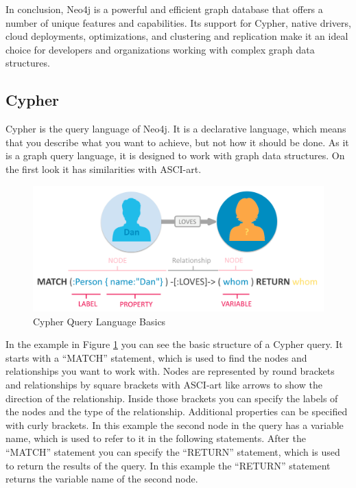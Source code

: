 In conclusion, Neo4j is a powerful and efficient graph database that offers a number of unique features and capabilities. Its support for Cypher, native drivers, cloud deployments, optimizations, and clustering and replication make it an ideal choice for developers and organizations working with complex graph data structures.

\subsection{Cypher} \label{subsec:Cypher}

Cypher is the query language of Neo4j. It is a declarative language, which means that you describe what you want to achieve, but not how it should be done. As it is a graph query language, it is designed to work with graph data structures. On the first look it has similarities with ASCI-art.

\begin{figure}[!h]
    \centering
    \includegraphics[width=1 \linewidth]{images/cypher_example.png}
    \caption{Cypher Query Language Basics \parencite{neo4j:cypher}} \label{img:cypher}
\end{figure}

In the example in Figure \ref{img:cypher} you can see the basic structure of a Cypher query. It starts with a “MATCH” statement, which is used to find the nodes and relationships you want to work with. Nodes are represented by round brackets and relationships by square brackets with ASCI-art like arrows to show the direction of the relationship. Inside those brackets you can specify the labels of the nodes and the type of the relationship. Additional properties can be specified with curly brackets. In this example the second node in the query has a variable name, which is used to refer to it in the following statements. After the “MATCH” statement you can specify the “RETURN” statement, which is used to return the results of the query. In this example the “RETURN” statement returns the variable name of the second node.

